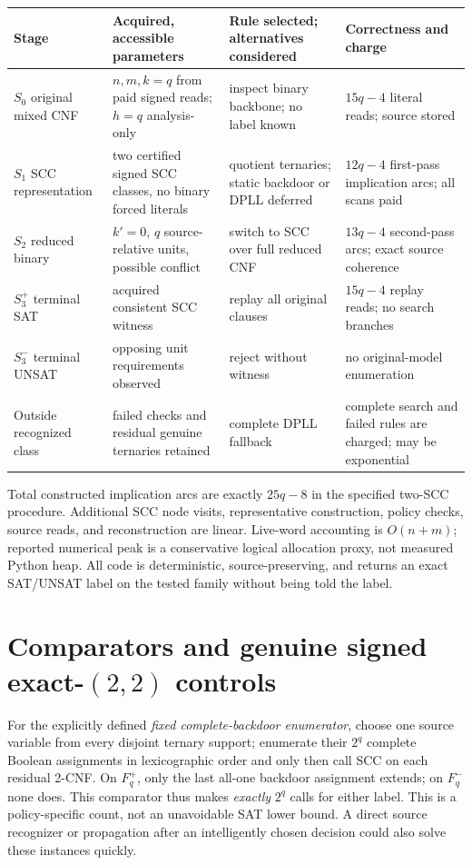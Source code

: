 \documentclass[11pt]{article}
\begin{document}
\begin{center}\small
\begin{tabular}{p{.18\linewidth}p{.24\linewidth}p{.27\linewidth}p{.22\linewidth}}
\toprule
Stage & Acquired, accessible parameters & Rule selected; alternatives considered & Correctness and charge\\\midrule
$S_0$ original mixed CNF & $n,m,k=q$ from paid signed reads; $h=q$ analysis-only & inspect binary backbone; no label known & $15q-4$ literal reads; source stored\\
$S_1$ SCC representation & two certified signed SCC classes, no binary forced literals & quotient ternaries; static backdoor or DPLL deferred & $12q-4$ first-pass implication arcs; all scans paid\\
$S_2$ reduced binary & $k'=0$, $q$ source-relative units, possible conflict & switch to SCC over full reduced CNF & $13q-4$ second-pass arcs; exact source coherence\\
$S_3^+$ terminal SAT & acquired consistent SCC witness & replay all original clauses & $15q-4$ replay reads; no search branches\\
$S_3^-$ terminal UNSAT & opposing unit requirements observed & reject without witness & no original-model enumeration\\
Outside recognized class & failed checks and residual genuine ternaries retained & complete DPLL fallback & complete search and failed rules are charged; may be exponential\\
\bottomrule
\end{tabular}
\end{center}
Total constructed implication arcs are exactly $25q-8$ in the specified two-SCC procedure. Additional SCC node visits, representative construction, policy checks, source reads, and reconstruction are linear. Live-word accounting is $O(n+m)$; reported numerical peak is a conservative logical allocation proxy, not measured Python heap. All code is deterministic, source-preserving, and returns an exact SAT/UNSAT label on the tested family without being told the label.

\section{Comparators and genuine signed exact-$(2,2)$ controls}
For the explicitly defined \emph{fixed complete-backdoor enumerator}, choose one source variable from every disjoint ternary support; enumerate their $2^q$ complete Boolean assignments in lexicographic order and only then call SCC on each residual 2-CNF. On $F_q^+$, only the last all-one backdoor assignment extends; on $F_q^-$ none does. This comparator thus makes \emph{exactly} $2^q$ calls for either label. This is a policy-specific count, not an unavoidable SAT lower bound. A direct source recognizer or propagation after an intelligently chosen decision could also solve these instances quickly.
\end{document}
